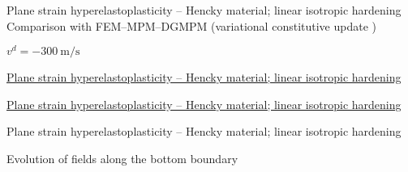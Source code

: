 
\begin{frame}{Plane strain hyperelastoplasticity -- Hencky material; linear isotropic hardening}
  \footnotesize Comparison with FEM--MPM--DGMPM (variational constitutive update \cite{LaurentVariational})
  \centering
  
  \footnotesize $v^d = -300 \: \text{m/s}$
  
\end{frame}

\begin{frame}{\href{section4/animation/hyperelastoplasticity/stress.mp4}{Plane strain hyperelastoplasticity -- Hencky material; linear isotropic hardening}}
  \begin{center}
  \end{center}
\end{frame}


\begin{frame}{\href{section4/animation/hyperelastoplasticity/epeq.mp4}{Plane strain hyperelastoplasticity -- Hencky material; linear isotropic hardening}}
  \begin{center}
  \end{center}
\end{frame}



\begin{frame}{Plane strain hyperelastoplasticity -- Hencky material; linear isotropic hardening}
  \begin{block}{Evolution of fields along the bottom boundary}
    
  \end{block}
  \begin{columns}
    \begin{column}{0.49\textwidth}
      
    \end{column}
    \begin{column}{0.49\textwidth}
      
    \end{column}
  \end{columns}
\end{frame}
